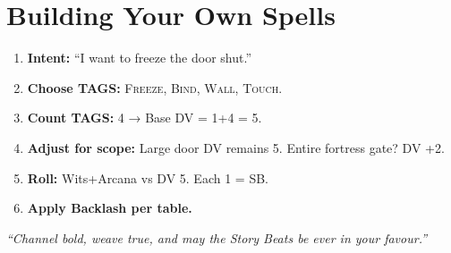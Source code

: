 \documentclass[10pt,a5paper]{book}
\newcommand{\tag}[1]{\textsc{#1}}
\begin{document}
\section{Building Your Own Spells}
\begin{enumerate}
    \item \textbf{Intent:} “I want to freeze the door shut.”
    \item \textbf{Choose TAGS:} \tag{Freeze}, \tag{Bind}, \tag{Wall}, \tag{Touch}.
    \item \textbf{Count TAGS:} 4 → Base DV = 1+4 = 5.
    \item \textbf{Adjust for scope:} Large door DV remains 5. Entire fortress gate? DV +2.
    \item \textbf{Roll:} Wits+Arcana vs DV 5. Each 1 = SB.
    \item \textbf{Apply Backlash per table.}
\end{enumerate}
\vspace{0.5cm}
\textit{“Channel bold, weave true, and may the Story Beats be ever in your favour.”}
\end{document}
